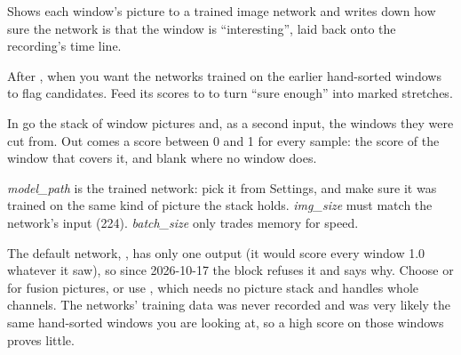 Shows each window's picture to a trained image network and writes down how sure the network
is that the window is ``interesting'', laid back onto the recording's time line.

After , when you want the networks trained on the earlier
hand-sorted windows to flag candidates. Feed its scores to  to
turn ``sure enough'' into marked stretches.

In go the stack of window pictures and, as a second input, the windows they were cut from.
Out comes a score between 0 and 1 for every sample: the score of the window that covers it,
and blank where no window does.

\emph{model\_path} is the trained network: pick it from Settings, and make sure it was
trained on the same kind of picture the stack holds. \emph{img\_size} must match the
network's input (224). \emph{batch\_size} only trades memory for speed.

The default network, , has only one output (it would score every window
1.0 whatever it saw), so since 2026-10-17 the block refuses it and says why. Choose
 or  for fusion pictures, or use
, which needs no picture stack and handles whole channels. The networks' training data was never recorded and was very likely the same
hand-sorted windows you are looking at, so a high score on those windows proves little.
